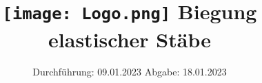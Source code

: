 

\subject{V103}
\title{\texttt{[image: Logo.png]}
Biegung elastischer Stäbe}
\date{%
  Durchführung: 09.01.2023
  \hspace{3em}
  Abgabe: 18.01.2023
}



\maketitle
\thispagestyle{empty}
\tableofcontents
\newpage






\printbibliography{}


